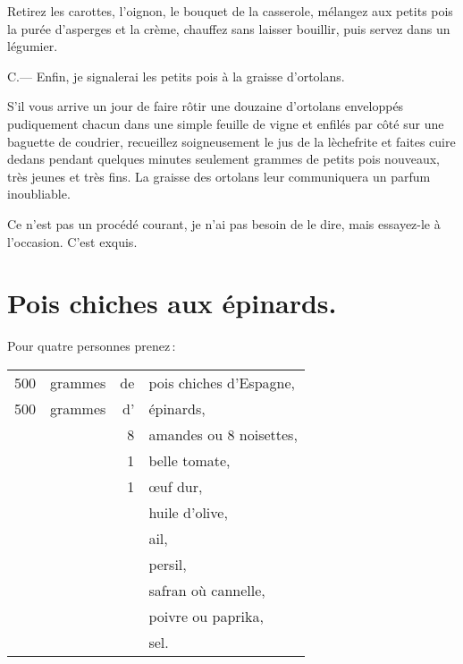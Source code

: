 Retirez les carottes, l'oignon, le bouquet de la casserole, mélangez aux petits
pois la purée d’asperges et la crème, chauffez sans laisser bouillir, puis
servez dans un légumier.

\medskip

C.— Enfin, je signalerai les petits pois à la graisse d'ortolans.

S'il vous arrive un jour de faire rôtir une douzaine d'ortolans enveloppés
pudiquement chacun dans une simple feuille de vigne et enfilés par côté sur une
baguette de coudrier, recueillez soigneusement le jus de la lèchefrite et
faites cuire dedans pendant quelques minutes seulement {\mmm} grammes de
petits pois nouveaux, très jeunes et très fins. La graisse des ortolans leur
communiquera un parfum inoubliable.

Ce n'est pas un procédé courant, je n'ai pas besoin de le dire, mais essayez-le
à l'occasion. C'est exquis.

\section*{\centering Pois chiches aux épinards.}
{}

Pour quatre personnes prenez :
\footnotesize
\begin{longtable}{rrrp{16em}}
    500 & grammes & de & pois chiches d'Espagne,                                                          \\
    500 & grammes & d' & épinards,                                                                        \\
        &         &  8 & amandes ou 8 noisettes,                                                          \\
        &         &  1 & belle tomate,                                                                    \\
        &         &  1 & œuf dur,                                                                         \\
        &         &    & huile d'olive,                                                                   \\
        &         &    & ail,                                                                             \\
        &         &    & persil,                                                                          \\
        &         &    & safran où cannelle,                                                              \\
        &         &    & poivre ou paprika,                                                               \\
        &         &    & sel.                                                                             \\
\end{longtable}
\normalsize

